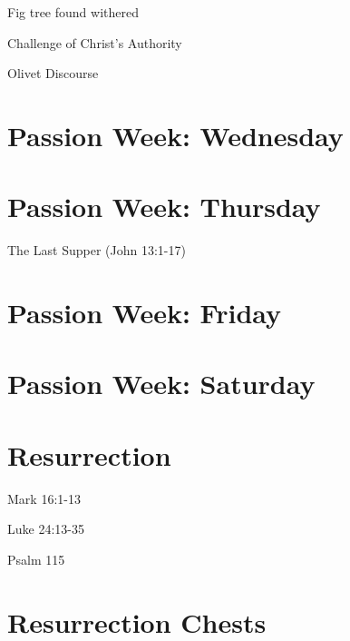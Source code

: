 Fig tree found withered

Challenge of Christ's Authority

Olivet Discourse


\section{Passion Week: Wednesday}


\section{Passion Week: Thursday}

The Last Supper (John 13:1-17)


\section{Passion Week: Friday}


\section{Passion Week: Saturday}




\section{Resurrection}

Mark 16:1-13

Luke 24:13-35

Psalm 115





\section{Resurrection Chests}

